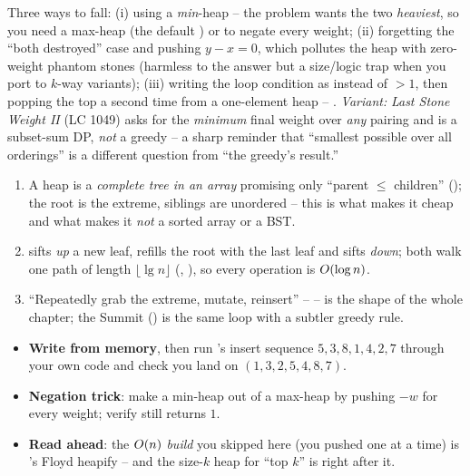 \begin{warningbox}
Three ways to fall: (i) using a \emph{min}-heap -- the problem wants the two \emph{heaviest}, so you need a
max-heap (the default ) or to negate every weight; (ii) forgetting the ``both
destroyed'' case and pushing $y-x=0$, which pollutes the heap with zero-weight phantom stones (harmless to
the answer but a size/logic trap when you port to $k$-way variants); (iii) writing the loop condition as
 instead of $>1$, then popping the top a second time from a one-element heap -- \re.
\emph{Variant:} \emph{Last Stone Weight II} (LC 1049) asks for the \emph{minimum} final weight over
\emph{any} pairing and is a subset-sum DP, \emph{not} a greedy -- a sharp reminder that ``smallest possible
over all orderings'' is a different question from ``the greedy's result.''
\end{warningbox}

\begin{insightbox}
\begin{enumerate}[nosep, leftmargin=1.6em]
  \item A heap is a \emph{complete tree in an array} promising only ``parent $\le$ children''
        (); the root is the extreme, siblings are unordered -- this is what makes it cheap
        and what makes it \emph{not} a sorted array or a BST.
  \item {} sifts \emph{up} a new leaf,  refills the root with the last leaf and sifts
        \emph{down}; both walk one path of length $\lfloor\lg n\rfloor$ (,
        ), so every operation is $O(\log n)$.
  \item ``Repeatedly grab the extreme, mutate, reinsert'' --  -- is the shape of the
        whole chapter; the Summit () is the same loop with a subtler greedy rule.
\end{enumerate}
\end{insightbox}

\begin{hardeningbox}
\begin{itemize}[nosep, leftmargin=1.4em]
  \item \textbf{Write  from memory}, then run 's insert sequence
        $5,3,8,1,4,2,7$ through your own code and check you land on $(1,3,2,5,4,8,7)$.
  \item \textbf{Negation trick}: make a min-heap out of a max-heap by pushing $-w$ for every weight; verify
         still returns $1$.
  \item \textbf{Read ahead}: the $O(n)$ \emph{build} you skipped here (you pushed one at a time) is
        's Floyd heapify -- and the size-$k$ heap for ``top $k$'' is right after it.
\end{itemize}
\end{hardeningbox}

